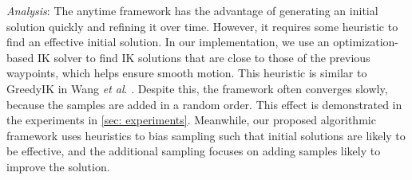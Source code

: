 \textit{Analysis}:
The \naive anytime framework has the advantage of generating an initial solution quickly and refining it over time. 
However, it requires some heuristic to find an effective initial solution. In our implementation, we use an optimization-based IK solver to find IK solutions that are close to those of the previous waypoints, which helps ensure smooth motion. This heuristic is similar to GreedyIK in Wang \textit{et al}. \cite{wang2024iklink}.
Despite this, the \naive framework often converges slowly, because the samples are added in a random order. 
This effect is demonstrated in the experiments in \cref{sec: experiments}. 
Meanwhile, our proposed algorithmic framework uses heuristics to bias sampling such that initial solutions are likely to be effective, and the additional sampling focuses on adding samples likely to improve the solution.

\iffalse
\begin{algorithm}
    \caption{\Naive Anytime Algorithmic Framework}
    \label{alg:incre_existing}
    \SetKwProg{Fn}{Function}{}{}
    \SetKwProg{For}{for}{\ do}{}
    \SetKwProg{If}{if}{\ then}{}
    \SetKwInOut{Input}{input}
    \SetKwInOut{Output}{output}
    \SetKwInOut{Hyper}{hparam}
    \SetKw{KwTo}{to}
    \SetKw{KwOr}{or}
    \SetKw{KwAnd}{and}
    \SetKwFunction{SEARCH}{SEARCH}%
    \SetKwFunction{SAMPLING}{SAMPLING}%
    \SetKwFunction{CDG}{ADD\_DENSE\_GRAPH}%

    \Input{an end-effector trajectory $\xi = \{(t_0, \mathbf{p}_0), (t_1, \mathbf{p}_1), ..., (t_{n-1}, \mathbf{p}_{n-1})\}$}
    \Output{a joint space trajectory $p$}
    \Hyper{number of IK solutions per iteration $\Delta m$ \\
        max iteration $i_{max}$ }
    $V \leftarrow \emptyset$ \\
    $E \leftarrow \emptyset$ \\
    $i \leftarrow 0$ \\
    \While {$i < i_{max}$} {
        \Comment*[l]{Sampling}
        $V \leftarrow V \cup \SAMPLING(\xi, step=1, \Delta m)$ \\
        \Comment*[l]{Graph Search}
        $E \leftarrow E \cup  \CDG(V)$ \\
        $G \leftarrow (V, E)$ \\
        $p =$ \SEARCH(G) \\
        $i \leftarrow i + 1$ 
    }
\end{algorithm}
\fi


